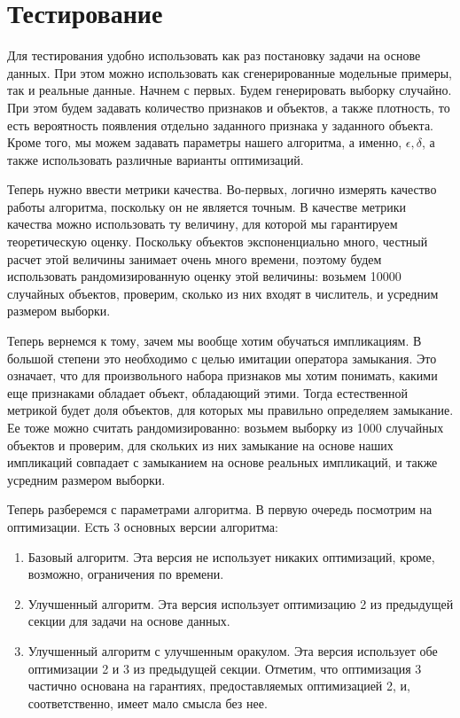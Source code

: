 \section{Тестирование}

Для тестирования удобно использовать как раз постановку задачи на основе данных. При этом можно использовать как сгенерированные модельные примеры, так и реальные данные. Начнем с первых. Будем генерировать выборку случайно. При этом будем задавать количество признаков и объектов, а также плотность, то есть вероятность появления отдельно заданного признака у заданного объекта. Кроме того, мы можем задавать параметры нашего алгоритма, а именно, $\epsilon, \delta$, а также использовать различные варианты оптимизаций.

Теперь нужно ввести метрики качества. Во-первых, логично измерять качество работы алгоритма, поскольку он не является точным. В качестве метрики качества можно использовать ту величину, для которой мы гарантируем теоретическую оценку. Поскольку объектов экспоненциально много, честный расчет этой величины занимает очень много времени, поэтому будем использовать рандомизированную оценку этой величины: возьмем 10000 случайных объектов, проверим, сколько из них входят в числитель, и усредним размером выборки.

Теперь вернемся к тому, зачем мы вообще хотим обучаться импликациям. В большой степени это необходимо с целью имитации оператора замыкания. Это означает, что для произвольного набора признаков мы хотим понимать, какими еще признаками обладает объект, обладающий этими. Тогда естественной метрикой будет доля объектов, для которых мы правильно определяем замыкание. Ее тоже можно считать рандомизированно: возьмем выборку из 1000 случайных объектов и проверим, для скольких из них замыкание на основе наших импликаций совпадает с замыканием на основе реальных импликаций, и также усредним размером выборки.

Теперь разберемся с параметрами алгоритма. В первую очередь посмотрим на оптимизации. Eсть 3 основных версии алгоритма:

\begin{enumerate}
	\item Базовый алгоритм. Эта версия не использует никаких оптимизаций, кроме, возможно, ограничения по времени.
	\item Улучшенный алгоритм. Эта версия использует оптимизацию 2 из предыдущей секции для задачи на основе данных.
	\item Улучшенный алгоритм с улучшенным оракулом. Эта версия использует обе оптимизации 2 и 3 из предыдущей секции. Отметим, что оптимизация 3 частично основана на гарантиях, предоставляемых оптимизацией 2, и, соответственно, имеет мало смысла без нее.
\end{enumerate}

